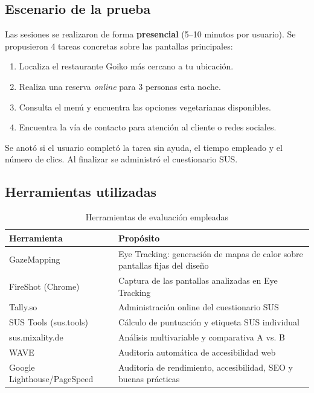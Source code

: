 \documentclass[11pt,a4paper]{article}
\begin{document}
\subsection{Escenario de la prueba}

Las sesiones se realizaron de forma \textbf{presencial} (5–10 minutos por usuario).
Se propusieron 4 tareas concretas sobre las pantallas principales:

\begin{enumerate}
  \item Localiza el restaurante Goiko más cercano a tu ubicación.
  \item Realiza una reserva \textit{online} para 3 personas esta noche.
  \item Consulta el menú y encuentra las opciones vegetarianas disponibles.
  \item Encuentra la vía de contacto para atención al cliente o redes sociales.
\end{enumerate}

Se anotó si el usuario completó la tarea sin ayuda, el tiempo empleado y el número de clics.
Al finalizar se administró el cuestionario SUS.

\subsection{Herramientas utilizadas}

\begin{table}[H]
\centering
\caption{Herramientas de evaluación empleadas}
\begin{tabularx}{\textwidth}{@{} L{4.5cm} X @{}}
\toprule
{}
\color{white}\textbf{Herramienta}         &
\color{white}\textbf{Propósito}           \\
\midrule
GazeMapping                 & Eye Tracking: generación de mapas de calor sobre pantallas fijas del diseño \\
FireShot (Chrome)           & Captura de las pantallas analizadas en Eye Tracking \\
Tally.so                    & Administración online del cuestionario SUS \\
SUS Tools (sus.tools)       & Cálculo de puntuación y etiqueta SUS individual \\
sus.mixality.de             & Análisis multivariable y comparativa A vs. B \\
WAVE                        & Auditoría automática de accesibilidad web \\
Google Lighthouse/PageSpeed & Auditoría de rendimiento, accesibilidad, SEO y buenas prácticas \\
\bottomrule
\end{tabularx}
\end{table}
\end{document}
